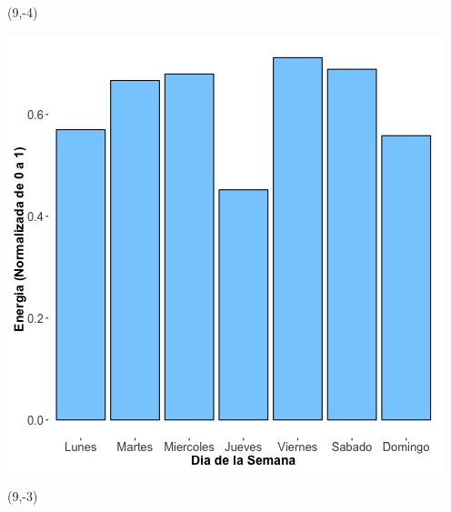 \documentclass{article}\usepackage[]{graphicx}\usepackage[]{color}
\newenvironment{knitrout}{}{} %
\begin{document}
 \begin{textblock}{1}(9,-4)
\begin{minipage}{20em}
\begingroup

\endgroup
\end{minipage}
\end{textblock}


\begin{knitrout}
\color{fgcolor}
\includegraphics[scale=0.65]{figure/A14_day_of_week_plot} 
\end{knitrout}


 \begin{textblock}{1}(9,-3)
\begin{minipage}{20em}
\begingroup

\endgroup
\end{minipage}
\end{textblock}
\end{document}
